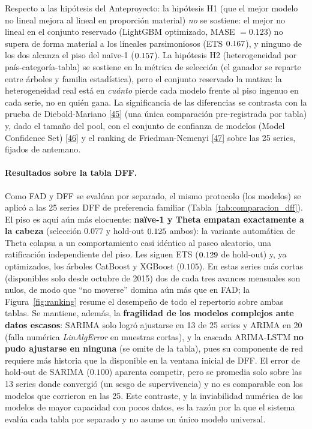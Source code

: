 \documentclass[12pt,letterpaper]{report}
\newcommand{\cita}[1]{\hyperref[bib:#1]{[#1]}}
\begin{document}
Respecto a las hipótesis del Anteproyecto: la hipótesis H1 (que el mejor modelo no
lineal mejora al lineal en proporción material) \textit{no} se sostiene: el mejor no
lineal en el conjunto reservado (LightGBM optimizado, MASE $=0.123$) no supera de forma
material a los lineales parsimoniosos (ETS $0.167$), y ninguno de los dos
alcanza el piso del naïve-1 ($0.157$). La hipótesis H2 (heterogeneidad por
país-categoría-tabla) se sostiene en la métrica de selección (el ganador se reparte entre
árboles y familia estadística), pero el conjunto reservado la matiza: la heterogeneidad
real está en \textit{cuánto} pierde cada modelo frente al piso ingenuo en cada serie, no
en quién gana. La significancia de las diferencias se contrasta con la prueba de
Diebold-Mariano \cita{45} (una única comparación pre-registrada por tabla) y, dado el tamaño del pool, con el conjunto de
confianza de modelos (Model Confidence Set) \cita{46} y el ranking de Friedman-Nemenyi
\cita{47} sobre las 25 series, fijados de antemano.

\paragraph{Resultados sobre la tabla DFF.} Como FAD y DFF se evalúan por separado, el
mismo protocolo (los \factNModels{} modelos) se aplicó a las 25 series DFF de preferencia familiar
(Tabla~\ref{tab:comparacion_dff}). El piso es aquí aún más elocuente: \textbf{naïve-1 y
Theta empatan exactamente a la cabeza} (selección $0.077$ y hold-out
$0.125$ ambos): la variante automática de Theta colapsa a un
comportamiento casi idéntico al paseo aleatorio, una ratificación independiente del piso.
Les siguen ETS ($0.129$ de hold-out) y, ya optimizados, los árboles CatBoost y
XGBoost ($0.105$). En estas series más cortas (disponibles solo desde octubre de 2015)
dos de cada tres avances mensuales son nulos, de modo que ``no moverse'' domina aún más
que en FAD; la Figura~\ref{fig:ranking} resume el desempeño de todo el repertorio sobre
ambas tablas. Se mantiene, además, la
\textbf{fragilidad de los modelos complejos ante datos escasos}: SARIMA solo logró
ajustarse en 13 de 25 series y ARIMA en 20 (falla numérica \textit{LinAlgError} en
muestras cortas), y la cascada ARIMA-LSTM \textbf{no pudo ajustarse en ninguna} (se
omite de la tabla), pues su componente de red requiere más historia que la disponible en
la ventana inicial de DFF. El error de hold-out de SARIMA ($0.100$) aparenta competir,
pero se promedia solo sobre las 13 series donde convergió (un sesgo de supervivencia) y
no es comparable con los modelos que corrieron en las 25. Este contraste, y la
inviabilidad numérica de los modelos de mayor capacidad con pocos datos, es la razón por
la que el sistema evalúa cada tabla por separado y no asume un único modelo universal.
\end{document}
